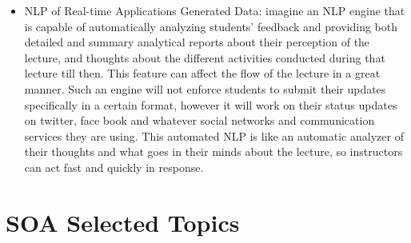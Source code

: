 \documentclass[12pt,a4paper,final,twoside,onecolumn,titlepage]{book}
\begin{document}
\begin{itemize}
\item NLP of Real-time Applications Generated Data: imagine an NLP engine that is capable of automatically analyzing students’ feedback and providing both detailed and summary analytical reports about their perception of the lecture, and thoughts about the different activities conducted during that lecture till then. This feature can affect the flow of the lecture in a great manner. Such an engine will not enforce students to submit their updates specifically in a certain format, however it will work on their status updates on twitter, face book and whatever social networks and communication services they are using. This automated NLP is like an automatic analyzer of their thoughts and what goes in their minds about the lecture, so instructors can act fast and 
quickly in response.
\end{itemize}

\section{SOA Selected Topics}
\end{document}
